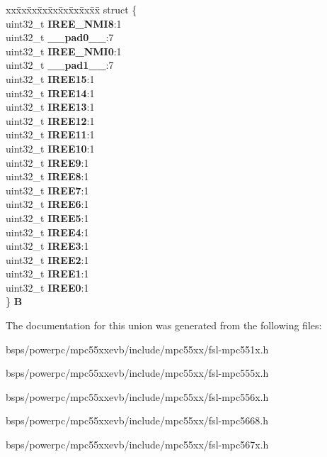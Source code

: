 \begin{DoxyCompactItemize}
\begin{tabbing}
\end{tabbing}\item 
\mbox{\label{unionSIU__tag_1_1SIU__IREER__tag_a4216f89250d360c66b1de713676d3a47}} 
\begin{tabbing}
xx\=xx\=xx\=xx\=xx\=xx\=xx\=xx\=xx\=\kill
struct \{\\
\>uint32\_t {\bfseries IREE\_NMI8}:1\\
\>uint32\_t {\bfseries \_\_pad0\_\_}:7\\
\>uint32\_t {\bfseries IREE\_NMI0}:1\\
\>uint32\_t {\bfseries \_\_pad1\_\_}:7\\
\>uint32\_t {\bfseries IREE15}:1\\
\>uint32\_t {\bfseries IREE14}:1\\
\>uint32\_t {\bfseries IREE13}:1\\
\>uint32\_t {\bfseries IREE12}:1\\
\>uint32\_t {\bfseries IREE11}:1\\
\>uint32\_t {\bfseries IREE10}:1\\
\>uint32\_t {\bfseries IREE9}:1\\
\>uint32\_t {\bfseries IREE8}:1\\
\>uint32\_t {\bfseries IREE7}:1\\
\>uint32\_t {\bfseries IREE6}:1\\
\>uint32\_t {\bfseries IREE5}:1\\
\>uint32\_t {\bfseries IREE4}:1\\
\>uint32\_t {\bfseries IREE3}:1\\
\>uint32\_t {\bfseries IREE2}:1\\
\>uint32\_t {\bfseries IREE1}:1\\
\>uint32\_t {\bfseries IREE0}:1\\
\} {\bfseries B}\\

\end{tabbing}\end{DoxyCompactItemize}


The documentation for this union was generated from the following files\+:\begin{DoxyCompactItemize}
\item 
bsps/powerpc/mpc55xxevb/include/mpc55xx/fsl-\/mpc551x.\+h\item 
bsps/powerpc/mpc55xxevb/include/mpc55xx/fsl-\/mpc555x.\+h\item 
bsps/powerpc/mpc55xxevb/include/mpc55xx/fsl-\/mpc556x.\+h\item 
bsps/powerpc/mpc55xxevb/include/mpc55xx/fsl-\/mpc5668.\+h\item 
bsps/powerpc/mpc55xxevb/include/mpc55xx/fsl-\/mpc567x.\+h\end{DoxyCompactItemize}
